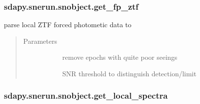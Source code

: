 \documentclass[letterpaper,10pt,english]{sphinxmanual}
\begin{document}
\begin{fulllineitems}
\begin{fulllineitems}
\end{fulllineitems}



\subsubsection{sdapy.snerun.snobject.get\_fp\_ztf}
\label{\detokenize{generated/sdapy.snerun.snobject.get_fp_ztf:sdapy-snerun-snobject-get-fp-ztf}}\label{\detokenize{generated/sdapy.snerun.snobject.get_fp_ztf::doc}}

\begin{fulllineitems}
\label{\detokenize{generated/sdapy.snerun.snobject.get_fp_ztf:sdapy.snerun.snobject.get_fp_ztf}}
parse local ZTF forced photometic data to 
\begin{quote}\begin{description}
\item[{Parameters}] \leavevmode\begin{description}
\item[{}] \leavevmode{[}\sphinxtitleref{float}{]}
remove epochs with quite poor seeings

\item[{}] \leavevmode{[}\sphinxtitleref{float}{]}
SNR threshold to distinguish detection/limit

\end{description}

\end{description}\end{quote}

\end{fulllineitems}



\subsubsection{sdapy.snerun.snobject.get\_local\_spectra}
\label{\detokenize{generated/sdapy.snerun.snobject.get_local_spectra:sdapy-snerun-snobject-get-local-spectra}}\label{\detokenize{generated/sdapy.snerun.snobject.get_local_spectra::doc}}


\end{fulllineitems}
\end{document}
